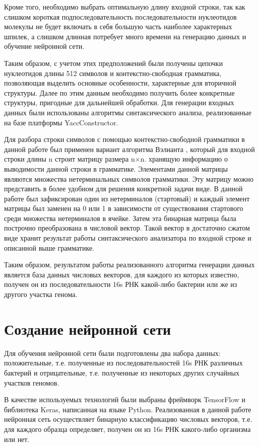 \documentclass[14pt]{matmex-diploma}
\begin{document}
Кроме того, необходимо выбрать оптимальную длину входной строки, так как слишком короткая подпоследовательность последовательности нуклеотидов молекулы не будет включать в себя большую часть наиболее характерных шпилек, а слишком длинная потребует много времени на генерацию данных и обучение нейронной сети.

Таким образом, с учетом этих предположений были получены цепочки нуклеотидов длины 512 символов и контекстно-свободная грамматика, позволяющая выделить основные особенности, характерные для вторичной структуры. Далее по этим данным необходимо получить более конкретные структуры, пригодные для дальнейшей обработки. Для генерации входных данных были использованы алгоритмы синтаксического анализа, реализованные на базе платформы YaccConstructor.


Для разбора строки символов с помощью контекстно-свободной грамматики в данной работе был применен вариант алгоритма Вэлианта \cite{18}, который для входной строки длины n строит матрицу размера n$\times$n. хранящую информацию о выводимости данной строки в грамматике. Элементами данной матрицы являются множества нетерминальных символов грамматики. Эту матрицу можно представить в более удобном для решения конкретной задачи виде. В данной работе был зафиксирован один из нетерминалов (стартовый) и каждый элемент матрицы был заменен на 0 или 1 в зависимости от существования стартового среди множества нетерминалов в ячейке. Затем эта бинарная матрица была построчно преобразована в числовой вектор. Такой вектор в достаточно сжатом виде хранит результат работы синтаксического анализатора по входной строке и описанной выше грамматике.

Таким образом, результатом работы реализованного алгоритма генерации данных является база данных числовых векторов, для каждого из которых известно, получен он из последовательности 16s РНК какой-либо бактерии или же из другого участка генома.


\section{Создание нейронной сети}
Для обучения нейронной сети были подготовлены два набора данных: положительные, т.е. полученные из последовательностей 16s РНК различных бактерий и отрицательные, т.е. полученные из некоторых других случайных участков геномов. 

В качестве используемых технологий были выбраны фреймворк \linebreak TensorFlow и библиотека Keras, написанная на языке Python. Реализованная в данной работе нейронная сеть осуществляет бинарную классификацию числовых векторов, т.е. для каждого образца определяет, получен он из 16s РНК какого-либо организма или нет.
\end{document}
